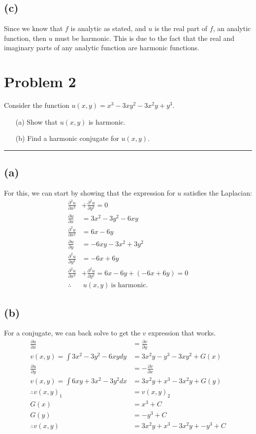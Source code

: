 \documentclass{article}
\newcommand{\parder}[2]{\frac{\partial#1}{\partial#2}}
\newcommand{\secparder}[2]{\frac{\partial^2#1}{\partial#2^2}}
\begin{document}
\subsection{(c)}
Since we know that $f$ is analytic as stated, and $u$ is the real part of $f$, an analytic function, then $u$ must be harmonic. This is due to the fact that the real and imaginary parts of any analytic function are harmonic functions.
\newpage
\section*{Problem 2}
Consider the function  $u(x,y) = x^3 - 3 x y^2 - 3 x^2 y + y^3$.

\begin{enumerate}
	\item [(a)] Show that $u(x,y)$ is harmonic.
	\item [(b)] Find a harmonic conjugate for $u(x,y)$.
\end{enumerate}


\vspace{.5cm} %

\hrule
\subsection*{(a)}
For this, we can start by showing that the expression for $u$ satisfies the Laplacian:
\begin{align*}
  \secparder{u}{x} &+ \secparder{u}{y} = 0\\
  \parder{u}{x} &= 3x^2 - 3 y^2 - 6xy\\
  \secparder{u}{x} &= 6x - 6y\\
  \parder{u}{y} &= - 6 x y - 3 x^2  + 3y^2\\
  \secparder{u}{y} &= - 6 x  + 6y\\
  \secparder{u}{x} &+ \secparder{u}{y} = 6x - 6y + (- 6 x  + 6y) = 0\\
  \therefore &\ u(x,y)\ \text{is harmonic.}
\end{align*}
\subsection*{(b)}
For a conjugate, we can back solve to get the $v$ expression that works.
\begin{align*}
  \parder{u}{x} &= \parder{v}{y} \\
  v(x,y) = \int 3x^2 - 3 y^2 - 6xy dy &= 3x^2y - y^3 - 3xy^2 + G(x)\\
  \parder{u}{y} &= -\parder{v}{x} \\
  v(x,y) = \int  6 x y + 3 x^2  - 3y^2 dx &= 3x^2y + x^3 -3x^2y + G(y)\\
  \therefore  v(x,y)_1 &= v(x,y)_2 \\
  G(x) &= x^3 + C\\
  G(y) &= -y^3 + C\\
  \therefore v(x,y) &= \boxed{ 3x^2y + x^3 -3x^2y + -y^3 + C}
\end{align*}
\newpage
\end{document}
